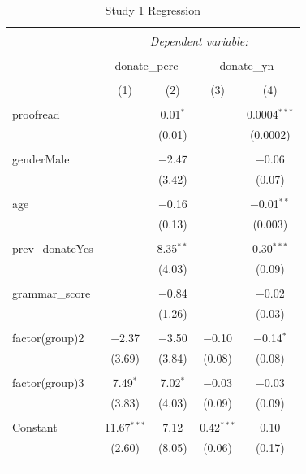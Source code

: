 \documentclass[]{article}
\begin{document}
\begin{table}[!htbp] \centering 
  \caption{Study 1 Regression} 
  \label{} 
\begin{tabular}{@{\extracolsep{5pt}}lcccc} 
\\[-1.8ex]\hline 
\hline \\[-1.8ex] 
 & \multicolumn{4}{c}{\textit{Dependent variable:}} \\ 
\cline{2-5} 
\\[-1.8ex] & \multicolumn{2}{c}{donate\_perc} & \multicolumn{2}{c}{donate\_yn} \\ 
\\[-1.8ex] & (1) & (2) & (3) & (4)\\ 
\hline \\[-1.8ex] 
 proofread &  & 0.01$^{*}$ &  & 0.0004$^{***}$ \\ 
  &  & (0.01) &  & (0.0002) \\ 
  & & & & \\ 
 genderMale &  & $-$2.47 &  & $-$0.06 \\ 
  &  & (3.42) &  & (0.07) \\ 
  & & & & \\ 
 age &  & $-$0.16 &  & $-$0.01$^{**}$ \\ 
  &  & (0.13) &  & (0.003) \\ 
  & & & & \\ 
 prev\_donateYes &  & 8.35$^{**}$ &  & 0.30$^{***}$ \\ 
  &  & (4.03) &  & (0.09) \\ 
  & & & & \\ 
 grammar\_score &  & $-$0.84 &  & $-$0.02 \\ 
  &  & (1.26) &  & (0.03) \\ 
  & & & & \\ 
 factor(group)2 & $-$2.37 & $-$3.50 & $-$0.10 & $-$0.14$^{*}$ \\ 
  & (3.69) & (3.84) & (0.08) & (0.08) \\ 
  & & & & \\ 
 factor(group)3 & 7.49$^{*}$ & 7.02$^{*}$ & $-$0.03 & $-$0.03 \\ 
  & (3.83) & (4.03) & (0.09) & (0.09) \\ 
  & & & & \\ 
 Constant & 11.67$^{***}$ & 7.12 & 0.42$^{***}$ & 0.10 \\ 
  & (2.60) & (8.05) & (0.06) & (0.17) \\ 
  & & & & \\ 
\hline \\[-1.8ex] 

\end{tabular}
\end{table}
\end{document}
